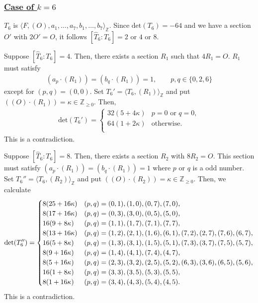 \documentclass[10pt]{article}
\begin{document}
\subsubsection*{\underline{Case of $k=6$}}


$T_6$ is $\langle F,(O),a_1,\dots,a_7,b_1,\dots,b_7\rangle_\mathbb{Z} $.
Since $\mathrm{det}(T_6)=-64$ and we have a section $O'$ with $2O'=O$, it follows $\left[\widehat{T}_6:T_6\right]=2 \text{ or } 4 \text{ or } 8$.


Suppose
$\left[\widehat{T}_6:T_6\right]=4$.
Then, there exists a section $R_1$ such that $4R_1 =O$.
$R_1$ must satisfy
\begin{align*}
(a_p\cdot (R_1)) = ( b_q\cdot (R_1))  =1, \quad \quad
p,q\in\{0,2,6\}
\end{align*}
except for $(p,q)=(0,0)$.
Set $T_6'=\langle T_6,(R_1)\rangle_\mathbb{Z} $ and 
put $((O)\cdot (R_1))=\kappa\in \mathbb{Z}_{\geq 0}.$
Then, 
\begin{align}
\mathrm{det}(T_6')=
\begin{cases}
32(5+4\kappa) & p=0 \text{ or } q=0, \\ 
64(1+2\kappa)  & \text{otherwise}.\\
\end{cases}
\end{align}
This is a contradiction.

Suppose
$\left[\widehat{T}_6:T_6\right]=8$.
Then, there exists a section $R_2$ with $8R_2 =O$.
This section must satisfy
$(a_p\cdot (R_1)) =( b_q\cdot (R_1)) =1$
where $p$ or $q$ is a odd number.
Set
$T_6''=\langle T_6, (R_2) \rangle_\mathbb{Z} $
and put $((O)\cdot (R_2))=\kappa\in \mathbb{Z}_{\geq 0}$.
Then, we calculate
\begin{align*}
{\rm det}(T_6'')=
\begin{cases}
 8(25+16\kappa) & (p,q)=(0,1),(1,0),(0,7),(7,0),\\ 
8(17+16\kappa) & (p,q)=(0,3),(3,0),(0,5),(5,0),\\
16(9+8\kappa) & (p,q)=(1,1),(1,7),(7,1),(7,7),\\
8(13+16\kappa) & (p,q)=(1,2),(2,1),(1,6),(6,1),(7,2),(2,7),(7,6),(6,7),\\
16(5+8\kappa)& (p,q)=(1,3),(3,1),(1,5),(5,1),(7,3),(3,7),(7,5),(5,7),\\
8(9+16\kappa)& (p,q)=(1,4),(4,1),(7,4),(4,7),\\
8(5+16\kappa)& (p,q)=(2,3),(3,2),(2,5),(5,2),(6,3),(3,6),(6,5),(5,6) ,\\
16(1+8\kappa)& (p,q)=(3,3),(3,5),(5,3),(5,5) ,\\
8(1+16\kappa)& (p,q)=(3,4),(4,3),(5,4),(4,5) .\\
\end{cases}
\end{align*}
This is a contradiction.
\end{document}
